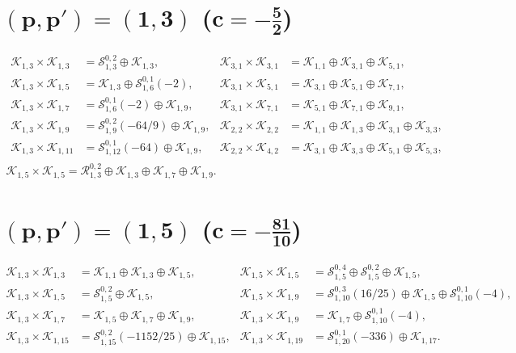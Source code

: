 \documentclass[a4paper,reqno,12pt]{report}
\theoremstyle{definition}
\numberwithin{equation}{section}
\newcommand{\Kac}[1]{\mathcal{K}_{#1}}       %
\newcommand{\Stag}[2]{\mathcal{S}_{#1}^{#2}} %
\newcommand{\fuse}{\mathbin{\times}}                                            %
\theoremstyle{plain}
\begin{document}
\section*{$\bm{(p,p')=(1,3)}$ ($\bm{c=-\frac{5}{2}}$)}

\begin{equation}
\begin{gathered}
\begin{aligned}
  \Kac{1,3}\fuse \Kac{1,3} &= \Stag{1,3}{0,2}\oplus \Kac{1,3}, &
  \Kac{3,1}\fuse \Kac{3,1} &= \Kac{1,1} \oplus \Kac{3,1} \oplus \Kac{5,1}, \\ 
  \Kac{1,3}\fuse \Kac{1,5} &= \Kac{1,3}\oplus \Stag{1,6}{0,1}(-2), &
  \Kac{3,1}\fuse \Kac{5,1} &= \Kac{3,1} \oplus \Kac{5,1} \oplus \Kac{7,1}, \\
  \Kac{1,3}\fuse \Kac{1,7} &= \Stag{1,6}{0,1}(-2) \oplus \Kac{1,9}, &
  \Kac{3,1}\fuse \Kac{7,1} &= \Kac{5,1}\oplus \Kac{7,1} \oplus \Kac{9,1}, \\
  \Kac{1,3}\fuse \Kac{1,9} &= \Stag{1,9}{0,2}(-64/9) \oplus \Kac{1,9}, & 
  \Kac{2,2}\fuse \Kac{2,2} &=  \Kac{1,1} \oplus \Kac{1,3} \oplus \Kac{3,1} \oplus \Kac{3,3}, \\
  \Kac{1,3}\fuse \Kac{1,11} &= \Stag{1,12}{0,1}(-64) \oplus \Kac{1,9}, &
  \Kac{2,2}\fuse \Kac{4,2} &= \Kac{3,1} \oplus \Kac{3,3} \oplus \Kac{5,1} \oplus \Kac{5,3},
\end{aligned}
\\
  \Kac{1,5}\fuse \Kac{1,5} = \mathcal{R}_{1,3}^{0,2}\oplus \Kac{1,3} \oplus \Kac{1,7} \oplus \Kac{1,9}.
\end{gathered}
\end{equation}

\medskip

\section*{$\bm{(p,p')=(1,5)}$ ($\bm{c=-\frac{81}{10}}$)}

\begin{equation}   
\begin{aligned}
  \Kac{1,3}\fuse \Kac{1,3} &= \Kac{1,1}\oplus \Kac{1,3}\oplus \Kac{1,5}, &
  \Kac{1,5}\fuse \Kac{1,5} &= \Stag{1,5}{0,4} \oplus \Stag{1,5}{0,2} \oplus \Kac{1,5}, \\
  \Kac{1,3}\fuse \Kac{1,5} &= \Stag{1,5}{0,2} \oplus \Kac{1,5}, &
  \Kac{1,5}\fuse \Kac{1,9} &= \Stag{1,10}{0,3}(16/25) \oplus \Kac{1,5} \oplus \Stag{1,10}{0,1}(-4) , \\
  \Kac{1,3}\fuse \Kac{1,7} &= \Kac{1,5}\oplus \Kac{1,7}\oplus \Kac{1,9}, &
  \Kac{1,3}\fuse \Kac{1,9} &= \Kac{1,7} \oplus \Stag{1,10}{0,1}(-4), \\
  \Kac{1,3}\fuse \Kac{1,15} &= \Stag{1,15}{0,2}(-1152/25) \oplus \Kac{1,15}, &
  \Kac{1,3}\fuse \Kac{1,19} &= \Stag{1,20}{0,1}(-336) \oplus \Kac{1,17}.
\end{aligned}
\end{equation}
\end{document}
